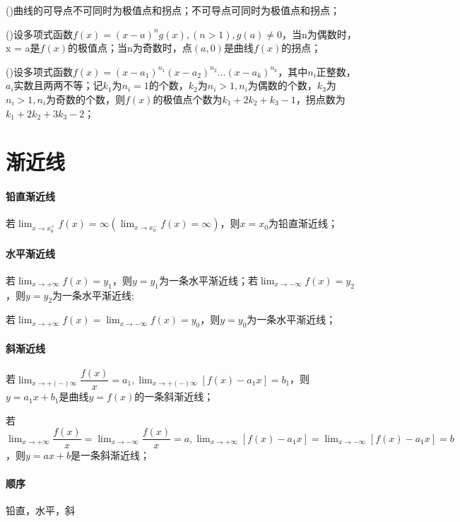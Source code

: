 ()曲线的可导点不可同时为极值点和拐点；不可导点可同时为极值点和拐点；

()设多项式函数\(f(x) = (x - a)^ng(x), (n > 1), g(a) \neq 0\)，当n为偶数时，x = a是\(f(x)\)的极值点；当n为奇数时，点\((a, 0)\)是曲线\(f(x)\)的拐点；

()设多项式函数\(f(x) = (x - a_1)^{n_1}(x - a_2)^{n_2}...(x - a_k)^{n_k}\)，其中\(n_i\)正整数，\(a_i\)实数且两两不等；记\(k_1\)为\(n_i = 1\)的个数，\(k_2\)为\(n_i > 1, n_i\)为偶数的个数，\(k_3\)为\(n_i > 1, n_i\)为奇数的个数，则\(f(x)\)的极值点个数为\(k_1 + 2k_2 + k_3 - 1\)，拐点数为\(k_1 + 2k_2 + 3k_3 - 2\)；

\section{渐近线}

\paragraph{铅直渐近线}
若\(\displaystyle\lim_{x \to x_0^+}f(x) = \infty(\lim_{x \to x_0^-}f(x) = \infty)\)，则\(x = x_0\)为铅直渐近线；

\paragraph{水平渐近线}
若\(\displaystyle\lim_{x \to +\infty}f(x) = y_1\)，则\(y = y_1\)为一条水平渐近线；若\(\displaystyle\lim_{x \to -\infty}f(x) = y_2\)，则\(y = y_2\)为一条水平渐近线;

若\(\displaystyle\lim_{x \to +\infty}f(x) = \lim_{x \to -\infty}f(x) = y_0\)，则\(y = y_0\)为一条水平渐近线；

\paragraph{斜渐近线}
若\(\displaystyle\lim_{x \to +(-)\infty}\dfrac{f(x)}{x} = a_1, \lim_{x \to +(-)\infty}[f(x) - a_1x] = b_1\)，则\(y = a_1x + b_1\)是曲线\(y = f(x)\)的一条斜渐近线；

若\(\displaystyle\lim_{x \to +\infty}\dfrac{f(x)}{x} = \lim_{x \to -\infty}\dfrac{f(x)}{x} = a, \lim_{x \to +\infty}[f(x) - a_1x] = \lim_{x \to -\infty}[f(x) - a_1x] = b\)，则\(y = ax + b\)是一条斜渐近线；

\paragraph{顺序}
铅直，水平，斜


